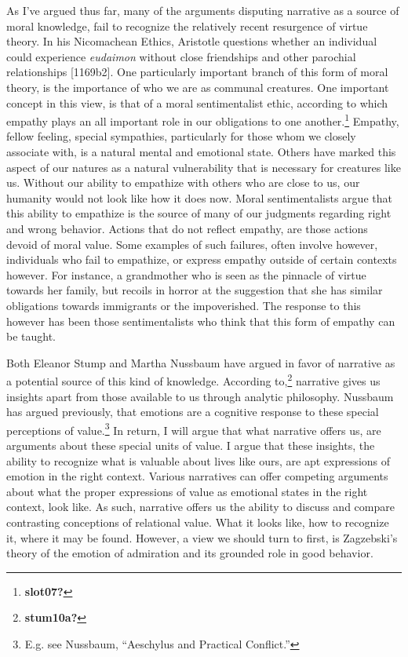 \documentclass[
  12pt,
]{book}
\theoremstyle{definition}
\theoremstyle{definition}
\theoremstyle{definition}
\theoremstyle{definition}
\theoremstyle{remark}
\begin{document}
As I've argued thus far, many of the arguments disputing narrative as a source of moral knowledge, fail to recognize the relatively recent resurgence of virtue theory. In his Nicomachean Ethics, Aristotle questions whether an individual could experience \emph{eudaimon} without close friendships and other parochial relationships {[}1169b2{]}. One particularly important branch of this form of moral theory, is the importance of who we are as communal creatures. One important concept in this view, is that of a moral sentimentalist ethic, according to which empathy plays an all important role in our obligations to one another.\footnote{\textbf{slot07?}} Empathy, fellow feeling, special sympathies, particularly for those whom we closely associate with, is a natural mental and emotional state. Others have marked this aspect of our natures as a natural vulnerability that is necessary for creatures like us. Without our ability to empathize with others who are close to us, our humanity would not look like how it does now. Moral sentimentalists argue that this ability to empathize is the source of many of our judgments regarding right and wrong behavior. Actions that do not reflect empathy, are those actions devoid of moral value. Some examples of such failures, often involve however, individuals who fail to empathize, or express empathy outside of certain contexts however. For instance, a grandmother who is seen as the pinnacle of virtue towards her family, but recoils in horror at the suggestion that she has similar obligations towards immigrants or the impoverished. The response to this however has been those sentimentalists who think that this form of empathy can be taught.

Both Eleanor Stump and Martha Nussbaum have argued in favor of narrative as a potential source of this kind of knowledge. According to,\footnote{\textbf{stum10a?}} narrative gives us insights apart from those available to us through analytic philosophy. Nussbaum has argued previously, that emotions are a cognitive response to these special perceptions of value.\footnote{E.g. see Nussbaum, {``Aeschylus and Practical Conflict.''}} In return, I will argue that what narrative offers us, are arguments about these special units of value. I argue that these insights, the ability to recognize what is valuable about lives like ours, are apt expressions of emotion in the right context. Various narratives can offer competing arguments about what the proper expressions of value as emotional states in the right context, look like. As such, narrative offers us the ability to discuss and compare contrasting conceptions of relational value. What it looks like, how to recognize it, where it may be found. However, a view we should turn to first, is Zagzebski's theory of the emotion of admiration and its grounded role in good behavior.
\end{document}
